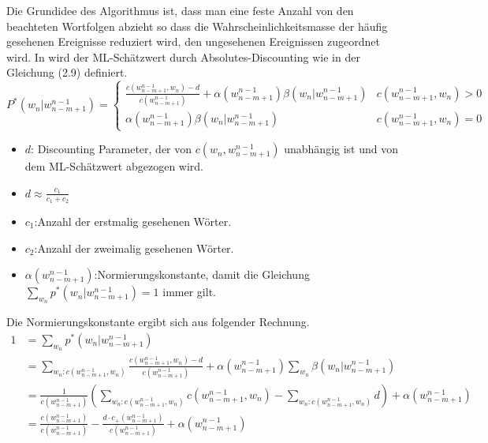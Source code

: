 Die Grundidee des Algorithmus ist, dass man eine feste Anzahl von den beachteten Wortfolgen abzieht so dass die Wahrscheinlichkeitsmasse der h\"aufig gesehenen Ereignisse reduziert wird, den ungesehenen Ereignissen zugeordnet wird. In \cite{ars_script} wird der ML-Sch\"atzwert durch Absolutes-Discounting wie in der Gleichung (2.9) definiert.
\begin{equation}
P^{*}(w_{n}|w_{n-m+1}^{n-1})=\begin{cases}
\frac{c(w_{n-m+1}^{n-1},w_{n})-d}{c(w_{n-m+1}^{n-1})}+\alpha (w_{n-m+1}^{n-1})\beta (w_{n}|w_{n-m+1}^{n-1}) & c(w_{n-m+1}^{n-1},w_{n})>0 \\
\alpha (w_{n-m+1}^{n-1})\beta (w_{n}|w_{n-m+1}^{n-1}) & c(w_{n-m+1}^{n-1},w_{n})=0 
\end{cases}
\end{equation}
\begin{itemize}
	\item $d$: Discounting Parameter, der von $c(w_{n},w_{n-m+1}^{n-1})$ unabh\"angig ist und von dem ML-Sch\"atzwert abgezogen wird.\\
	\item $d\approx \frac{c_{1}}{c_{1}+c_{2}}$ \\
	\item $c_{1}$:Anzahl der erstmalig gesehenen W\"orter.\\
	\item $c_{2}$:Anzahl der zweimalig gesehenen W\"orter.\\
	\item $\alpha (w_{n-m+1}^{n-1})$:Normierungskonstante, damit die Gleichung $\sum_{w_{n}}p^{*}(w_{n}|w_{n-m+1}^{n-1})=1$ immer gilt.
\end{itemize}
Die Normierungskonstante ergibt sich aus folgender Rechnung.
\begin{align}
1 &=\sum_{w_{n}}p^{*}(w_{n}|w_{n-m+1}^{n-1})\nonumber\\
&=\sum_{w_{n}:c(w_{n-m+1}^{n-1},w_{n})}\frac{c(w_{n-m+1}^{n-1},w_{n})-d}{c(w_{n-m+1}^{n-1})}+\alpha(w_{n-m+1}^{n-1})\sum_{w_{n}}\beta (w_{n}|w_{n-m+1}^{n-1}) \nonumber\\
&=\frac{1}{c(w_{n-m+1}^{n-1})} \left(\sum_{w_{n}:c(w_{n-m+1}^{n-1},w_{n})}c(w_{n-m+1}^{n-1},w_{n})-\sum_{w_{n}:c(w_{n-m+1}^{n-1},w_{n})}d \right)+\alpha (w_{n-m+1}^{n-1}) \nonumber\\
&=\frac{c(w_{n-m+1}^{n-1})}{c(w_{n-m+1}^{n-1})}-\frac{d\cdot c_{+}(w_{n-m+1}^{n-1})}{c(w_{n-m+1}^{n-1})}+\alpha (w_{n-m+1}^{n-1})
\end{align}

